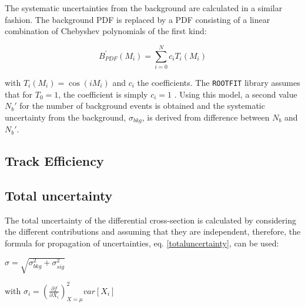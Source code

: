 The systematic uncertainties from the background are calculated in a similar fashion. The background PDF is replaced by a PDF consisting of a linear combination of Chebyshev polynomials of the first kind:

\begin{equation}
	B_{PDF}^{'}(M_i) = \sum_{i=0}^{N} c_i T_i(M_i) 
\end{equation}

with \cite{mason2002chebyshev} $T_i(M_i) = \cos(iM_i)$ and $c_i$ the coefficients. The \verb|ROOTFIT| library assumes that for $T_0 = 1$, the coefficient is simply $c_i = 1$ \cite{chebyshev}. Using this model, a second value $N_b'$ for the number of background events is obtained and the systematic uncertainty from the background, $\sigma_{bkg}$, is derived from difference between $N_b$ and $N_b'$.

\subsection{Track Efficiency}

\subsection{Total uncertainty}
The total uncertainty of the differential cross-section is calculated by considering the different contributions and assuming that they are independent, therefore, the formula for propagation of uncertainties, eq. \ref{totaluncertainty}, can be used:

$\sigma = \sqrt{\sigma_{bkg}^2 + \sigma_{sig}^2}$

with $\sigma_i = \left(\frac{\partial f}{\partial X_i}\right)^2_{X = \mu} var[X_i]$


